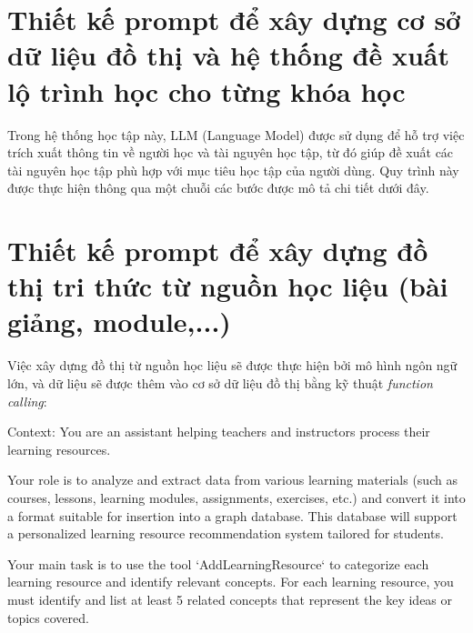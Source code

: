 \section{Thiết kế prompt để xây dựng cơ sở dữ liệu đồ thị và hệ thống đề xuất lộ trình học cho từng khóa học}

Trong hệ thống học tập này, LLM (Language Model) được sử dụng để hỗ trợ việc trích xuất thông tin về người học và tài nguyên học tập, từ đó giúp đề xuất các tài nguyên học tập phù hợp với mục tiêu học tập của người dùng. Quy trình này được thực hiện thông qua một chuỗi các bước được mô tả chi tiết dưới đây.
\section{Thiết kế prompt để xây dựng đồ thị tri thức từ nguồn học liệu (bài giảng, module,...)}
Việc xây dựng đồ thị từ nguồn học liệu sẽ được thực hiện bởi mô hình ngôn ngữ lớn, và dữ liệu sẽ được thêm vào cơ sở dữ liệu đồ thị bằng kỹ thuật \emph{function calling}:

Context: You are an assistant helping teachers and instructors process their learning resources.

Your role is to analyze and extract data from various learning materials (such as courses, lessons, 
learning modules, assignments, exercises, etc.) and convert it into a format suitable for 
insertion into a graph database. This database will support a personalized learning resource 
recommendation system tailored for students.

Your main task is to use the tool `AddLearningResource` to categorize each learning resource 
and identify relevant concepts. For each learning resource, you must identify and list at least 
5 related concepts that represent the key ideas or topics covered.
    
